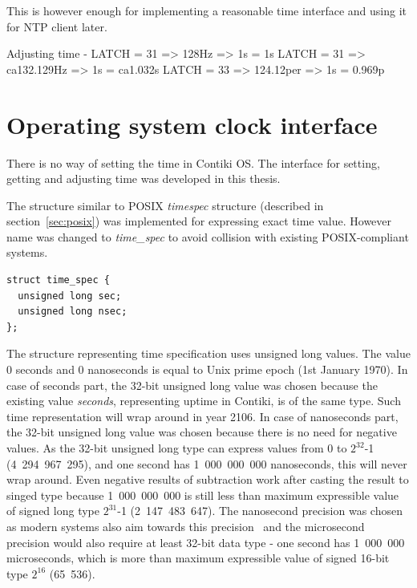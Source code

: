
This is however enough for implementing a reasonable time interface and using it for NTP client later.



Adjusting time - LATCH = 31 => 128Hz => 1s = 1s
LATCH = 31 => ca132.129Hz => 1s = ca1.032s
LATCH = 33 => 124.12per => 1s = 0.969p


\section{Operating system clock interface}
There is no way of setting the time in Contiki OS.
The interface for setting, getting and adjusting time was developed in this thesis.

The structure similar to POSIX {\it{timespec}} structure (described in section~\ref{sec:posix})
was implemented for expressing exact time value.
However name was changed to {\it{time\_spec}} to avoid collision with existing POSIX-compliant systems.
\begin{lstlisting}
struct time_spec {
  unsigned long sec;
  unsigned long nsec;
};
\end{lstlisting}
The structure representing time specification uses unsigned long values.
The value 0 seconds and 0 nanoseconds is equal to Unix prime epoch (1st January 1970).
In case of seconds part, the 32-bit unsigned long value was chosen because the existing value
{\it{seconds}}, representing uptime in Contiki, is of the same type.
Such time representation will wrap around in year 2106.
In case of nanoseconds part, the 32-bit unsigned long value was chosen because there is no need
for negative values.
As the 32-bit unsigned long type can express values from 0 to $2^{32}$-1 (4~294~967~295),
and one second has 1~000~000~000 nanoseconds, this will never wrap around.
Even negative results of subtraction work after casting the result to singed type
because 1~000~000~000 is still less than maximum expressible value of signed long type $2^{31}$-1 (2~147~483~647).
The nanosecond precision was chosen as modern systems also aim towards this precision~\cite{posix,ntp-precision} and
the microsecond precision would also require at least 32-bit data type -
one second has 1~000~000 microseconds, which is more than maximum expressible value of signed 16-bit
type $2^{16}$ (65~536).

